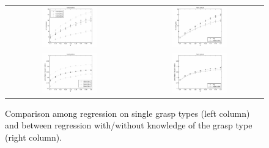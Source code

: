 \begin{figure}[htbp]
  \begin{center}
    \begin{tabular}{cc}
      \includegraphics[width=0.45\textwidth]{error_pst_cluster.eps} &
      \includegraphics[width=0.45\textwidth]{error_pst_cmp_cluster.eps} \\
      \includegraphics[width=0.45\textwidth]{error_pst_SV_cluster.eps} &
      \includegraphics[width=0.45\textwidth]{error_pst_cmp_SV_cluster.eps} \\
    \end{tabular}
    \caption{Comparison among regression on single grasp types (left
      column) and between regression with/without knowledge of the grasp
      type (right column).}
    \label{fig:clustering}
  \end{center}
\end{figure}


